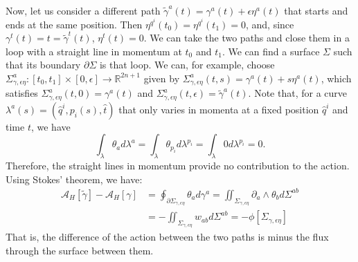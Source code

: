 \documentclass[nofootinbib,aps,pre]{revtex4-2}
\begin{document}
Now, let us consider a different path $\tilde \gamma^a(t) = \gamma^a(t) + \epsilon \eta^a(t)$ that starts and ends at the same position. Then $\eta^{q^i}(t_0)=\eta^{q^i}(t_1)=0$, and, since $\gamma^t(t) = t = \tilde\gamma^t(t)$, $\eta^t(t) = 0$. We can take the two paths and close them in a loop with a straight line in momentum at $t_0$ and $t_1$. We can find a surface $\Sigma$ such that its boundary $\partial \Sigma$ is that loop. We can, for example, choose $\Sigma^a_{\gamma, \epsilon \eta} : [t_0, t_1] \times [0,\epsilon] \to \mathbb{R}^{2n+1}$ given by $\Sigma^a_{\gamma, \epsilon \eta}(t,s) = \gamma^a(t) + s \eta^a(t)$, which satisfies $\Sigma^a_{\gamma, \epsilon \eta}(t,0) = \gamma^a(t)$ and $\Sigma^a_{\gamma, \epsilon \eta}(t,\epsilon) = \tilde \gamma^a(t)$. Note that, for a curve $\lambda^a(s) = (\hat{q}^i, p_i(s), \hat{t})$ that only varies in momenta at a fixed position $\hat{q}^i$ and time $t$, we have
\begin{equation}
    \int_{\lambda} \theta_a d\lambda^a = \int_{\lambda} \theta_{p_i} d\lambda^{p_i} = \int_{\lambda} 0 d\lambda^{p_i} =0.
\end{equation}
Therefore, the straight lines in momentum provide no contribution to the action. Using Stokes' theorem, we have:
\begin{equation}
    \begin{aligned}
        \mathcal{A}_H[\tilde \gamma] - \mathcal{A}_H[\gamma] &= \oint_{\partial \Sigma_{\gamma, \epsilon \eta}} \theta_a d \gamma^a
        =\iint_{\Sigma_{\gamma, \epsilon \eta}} \partial_a \wedge \theta_b d \Sigma^{ab} \\
        &= - \iint_{\Sigma_{\gamma, \epsilon \eta}} w_{ab} d \Sigma^{ab} = -\phi[\Sigma_{\gamma, \epsilon \eta}]
    \end{aligned}
\end{equation}
That is, the difference of the action between the two paths is minus the flux through the surface between them.
\end{document}
